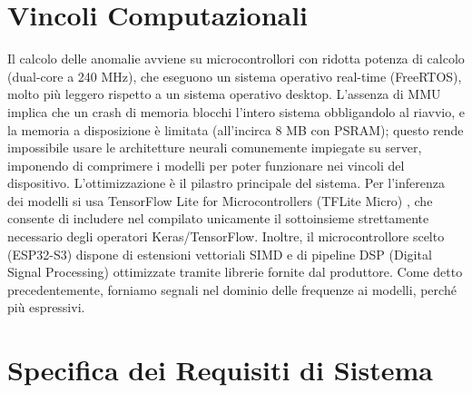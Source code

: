  \section{Vincoli Computazionali}
 Il calcolo delle anomalie avviene su microcontrollori con ridotta potenza di calcolo (dual-core a 240 MHz), che eseguono un sistema operativo real-time (FreeRTOS), molto più leggero rispetto a un sistema operativo desktop. L'assenza di MMU implica che un crash di memoria blocchi l'intero sistema obbligandolo al riavvio, e la memoria a disposizione è limitata (all'incirca 8 MB con PSRAM); questo rende impossibile usare le architetture neurali comunemente impiegate su server, imponendo di comprimere i modelli per poter funzionare nei vincoli del dispositivo.
 L'ottimizzazione è il pilastro principale del sistema. Per l'inferenza dei modelli si usa TensorFlow Lite for Microcontrollers (TFLite Micro) \cite{david2021tflitemicro,espressif_esp_tflite_micro}, che consente di includere nel compilato unicamente il sottoinsieme strettamente necessario degli operatori Keras/TensorFlow. Inoltre, il microcontrollore scelto (ESP32-S3) dispone di estensioni vettoriali SIMD e di pipeline DSP (Digital Signal Processing) ottimizzate tramite librerie fornite dal produttore.
 Come detto precedentemente, forniamo segnali nel dominio delle frequenze ai modelli, perché più espressivi.


\section{Specifica dei Requisiti di Sistema}

